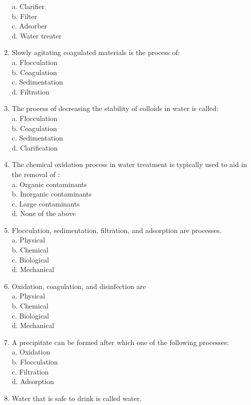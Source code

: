 \begin{enumerate}
a. Clarifier\\
b. Filter\\
c. Adsorber\\
d. Water treater\\
\item Slowly agitating coagulated materials is the process of:\\
a. Flocculation\\
b. Coagulation\\
c. Sedimentation\\
d. Filtration\\
\item The process of decreasing the stability of colloids in water is called:\\
a. Flocculation\\
b. Coagulation\\
c. Sedimentation\\
d. Clarification\\
\item The chemical oxidation process in water treatment is typically used to aid in the removal of :\\
a. Organic contaminants\\
b. Inorganic contaminants\\
c. Large contaminants\\
d. None of the above\\
\item Flocculation, sedimentation, filtration, and adsorption are processes.\\
a. Physical\\
b. Chemical\\
c. Biological\\
d. Mechanical\\
\item Oxidation, coagulation, and disinfection are\\
a. Physical\\
b. Chemical\\
c. Biological\\
d. Mechanical\\
\item A precipitate can be formed after which one of the following processes:\\
a. Oxidation\\
b. Flocculation\\
c. Filtration\\
d. Adsorption\\
\item Water that is safe to drink is called water.\\

\end{enumerate}
